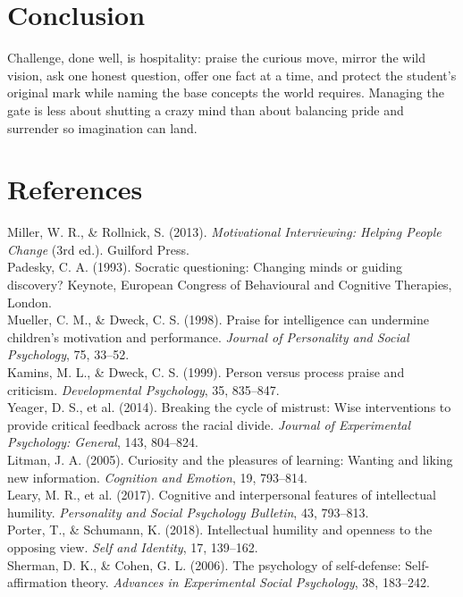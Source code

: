 \documentclass[11pt, a4paper]{article}
\begin{document}
\section{Conclusion}
Challenge, done well, is hospitality: praise the curious move, mirror the wild vision, ask one honest question, offer one fact at a time, and protect the student's original mark while naming the base concepts the world requires. Managing the gate is less about shutting a crazy mind than about balancing pride and surrender so imagination can land.

\section*{References}
\noindent [1] Miller, W. R., \& Rollnick, S. (2013). \textit{Motivational Interviewing: Helping People Change} (3rd ed.). Guilford Press.\\
\noindent [2] Padesky, C. A. (1993). Socratic questioning: Changing minds or guiding discovery? Keynote, European Congress of Behavioural and Cognitive Therapies, London.\\
\noindent [3] Mueller, C. M., \& Dweck, C. S. (1998). Praise for intelligence can undermine children's motivation and performance. \textit{Journal of Personality and Social Psychology}, 75, 33--52.\\
\noindent [4] Kamins, M. L., \& Dweck, C. S. (1999). Person versus process praise and criticism. \textit{Developmental Psychology}, 35, 835--847.\\
\noindent [5] Yeager, D. S., et al. (2014). Breaking the cycle of mistrust: Wise interventions to provide critical feedback across the racial divide. \textit{Journal of Experimental Psychology: General}, 143, 804--824.\\
\noindent [6] Litman, J. A. (2005). Curiosity and the pleasures of learning: Wanting and liking new information. \textit{Cognition and Emotion}, 19, 793--814.\\
\noindent [7] Leary, M. R., et al. (2017). Cognitive and interpersonal features of intellectual humility. \textit{Personality and Social Psychology Bulletin}, 43, 793--813.\\
\noindent [8] Porter, T., \& Schumann, K. (2018). Intellectual humility and openness to the opposing view. \textit{Self and Identity}, 17, 139--162.\\
\noindent [9] Sherman, D. K., \& Cohen, G. L. (2006). The psychology of self-defense: Self-affirmation theory. \textit{Advances in Experimental Social Psychology}, 38, 183--242.\\
\end{document}
